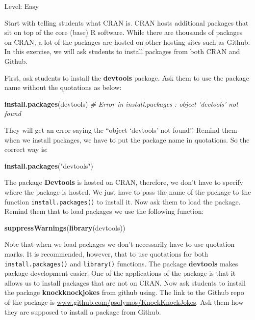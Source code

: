 \documentclass[]{book}
\newenvironment{Shaded}{\begin{snugshade}}{\end{snugshade}}
\newcommand{\CommentTok}[1]{\textcolor[rgb]{0.56,0.35,0.01}{\textit{#1}}}
\newcommand{\KeywordTok}[1]{\textcolor[rgb]{0.13,0.29,0.53}{\textbf{#1}}}
\newcommand{\NormalTok}[1]{#1}
\newcommand{\StringTok}[1]{\textcolor[rgb]{0.31,0.60,0.02}{#1}}
\begin{document}
Level: Easy

Start with telling students what CRAN is. CRAN hosts additional packages that sit on top of the core (base) R software. While there are thousands of packages on CRAN, a lot of the packages are hosted on other hosting sites such as Github. In this exercise, we will ask students to install packages from both CRAN and Github.

First, ask students to install the \textbf{devtools} package. Ask them to use the package name without the quotations as below:

\begin{Shaded}
\begin{Highlighting}[]
\KeywordTok{install.packages}\NormalTok{(devtools)}
\CommentTok{# Error in install.packages : object 'devtools' not found}
\end{Highlighting}
\end{Shaded}

They will get an error saying the ``object `devtools' not found''. Remind them when we install packages, we have to put the package name in quotations. So the correct way is:

\begin{Shaded}
\begin{Highlighting}[]
\KeywordTok{install.packages}\NormalTok{(}\StringTok{"devtools"}\NormalTok{)}
\end{Highlighting}
\end{Shaded}

The package \textbf{Devtools} is hosted on CRAN, therefore, we don't have to specify where the package is hosted. We just have to pass the name of the package to the function \texttt{install.packages()} to install it. Now ask them to load the package. Remind them that to load packages we use the following function:

\begin{Shaded}
\begin{Highlighting}[]
\KeywordTok{suppressWarnings}\NormalTok{(}\KeywordTok{library}\NormalTok{(devtools))}
\end{Highlighting}
\end{Shaded}

Note that when we load packages we don't necessarily have to use quotation marks. It is recommended, however, that to use quotations for both \texttt{install.packages()} and \texttt{library()} functions. The package \textbf{devtools} makes package development easier. One of the applications of the package is that it allows us to install packages that are not on CRAN. Now ask students to install the package \textbf{knockknockjokes} from github using. The link to the Github repo of the package is \url{www.github.com/psolymos/KnockKnockJokes}. Ask them how they are supposed to install a package from Github.
\end{document}
